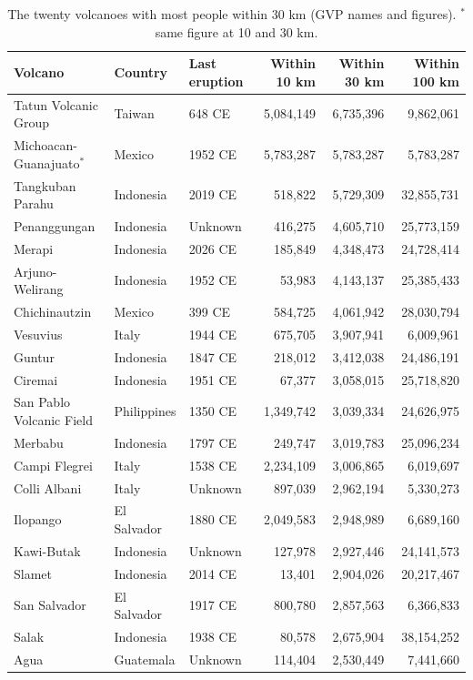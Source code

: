 \documentclass[11pt,a4paper]{article}
\begin{document}
\begin{table}[tbp]\centering\small\caption{The twenty volcanoes with most people within 30 km (GVP names and figures). $^*$ same figure at 10 and 30 km.}\label{tab:top}\setlength{\tabcolsep}{4pt}\begin{tabular}{lllrrr}\toprule Volcano & Country & Last eruption & Within 10 km & Within 30 km & Within 100 km\\\midrule
Tatun Volcanic Group & Taiwan & 648 CE & 5,084,149 & 6,735,396 & 9,862,061\\
Michoacan-Guanajuato$^*$ & Mexico & 1952 CE & 5,783,287 & 5,783,287 & 5,783,287\\
Tangkuban Parahu & Indonesia & 2019 CE & 518,822 & 5,729,309 & 32,855,731\\
Penanggungan & Indonesia & Unknown & 416,275 & 4,605,710 & 25,773,159\\
Merapi & Indonesia & 2026 CE & 185,849 & 4,348,473 & 24,728,414\\
Arjuno-Welirang & Indonesia & 1952 CE & 53,983 & 4,143,137 & 25,385,433\\
Chichinautzin & Mexico & 399 CE & 584,725 & 4,061,942 & 28,030,794\\
Vesuvius & Italy & 1944 CE & 675,705 & 3,907,941 & 6,009,961\\
Guntur & Indonesia & 1847 CE & 218,012 & 3,412,038 & 24,486,191\\
Ciremai & Indonesia & 1951 CE & 67,377 & 3,058,015 & 25,718,820\\
San Pablo Volcanic Field & Philippines & 1350 CE & 1,349,742 & 3,039,334 & 24,626,975\\
Merbabu & Indonesia & 1797 CE & 249,747 & 3,019,783 & 25,096,234\\
Campi Flegrei & Italy & 1538 CE & 2,234,109 & 3,006,865 & 6,019,697\\
Colli Albani & Italy & Unknown & 897,039 & 2,962,194 & 5,330,273\\
Ilopango & El Salvador & 1880 CE & 2,049,583 & 2,948,989 & 6,689,160\\
Kawi-Butak & Indonesia & Unknown & 127,978 & 2,927,446 & 24,141,573\\
Slamet & Indonesia & 2014 CE & 13,401 & 2,904,026 & 20,217,467\\
San Salvador & El Salvador & 1917 CE & 800,780 & 2,857,563 & 6,366,833\\
Salak & Indonesia & 1938 CE & 80,578 & 2,675,904 & 38,154,252\\
Agua & Guatemala & Unknown & 114,404 & 2,530,449 & 7,441,660\\
\bottomrule\end{tabular}\end{table}
\end{document}
